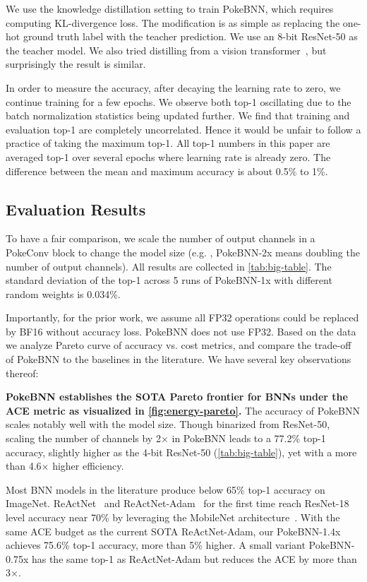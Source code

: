We use the knowledge distillation setting to train PokeBNN, which requires computing KL-divergence loss. The modification is as simple as replacing the one-hot ground truth label with the teacher prediction. We use an 8-bit ResNet-50 as the teacher model. We also tried distilling from a vision transformer~\cite{dosovitskiy2021vit}, but surprisingly the result is similar.

In order to measure the accuracy, after decaying the learning rate to zero, we continue training for a few epochs. We observe both top-1 oscillating due to the batch normalization statistics being updated further. We find that training and evaluation top-1 are completely uncorrelated. Hence it would be unfair to follow a practice of taking the maximum top-1. All top-1 numbers in this paper are averaged top-1 over several epochs where learning rate is already zero. The difference between the mean and maximum accuracy is about 0.5\% to 1\%.

\subsection{Evaluation Results}

To have a fair comparison, we scale the number of output channels in a PokeConv block to change the model size (e.g. , PokeBNN-2x means doubling the number of output channels). All results are collected in \ref{tab:big-table}. 
The standard deviation of the top-1 across 5 runs of PokeBNN-1x with different random weights is 0.034\%.

Importantly, for the prior work, we assume all FP32 operations could be replaced  by BF16 without accuracy loss. PokeBNN does not use FP32. Based on the data we analyze Pareto curve of accuracy vs. cost metrics, and compare the trade-off of PokeBNN to the baselines in the literature. We have several key observations thereof:

\textbf{{PokeBNN} establishes the SOTA Pareto frontier for BNNs under the ACE metric as visualized in \ref{fig:energy-pareto}.}
The accuracy of {PokeBNN} scales notably well with the model size. Though binarized from ResNet-50, scaling the number of channels by 2$\times$ in {PokeBNN} leads to a 77.2\% top-1 accuracy, slightly higher as the 4-bit ResNet-50 (\ref{tab:big-table}), yet with a more than 4.6$\times$ higher efficiency.

Most BNN models in the literature produce below 65\% top-1 accuracy on ImageNet. ReActNet~\cite{Liu2020reactnet} and ReActNet-Adam~\cite{liu2021adambnn} for the first time reach ResNet-18 level accuracy near 70\% by leveraging the MobileNet architecture~\cite{howard2017mobilenets}. With the same ACE budget as the current SOTA ReActNet-Adam, our PokeBNN-1.4x achieves 75.6\% top-1 accuracy, more than 5\% higher. A small variant PokeBNN-0.75x has the same top-1 as ReActNet-Adam but reduces the ACE by more than 3$\times$.

